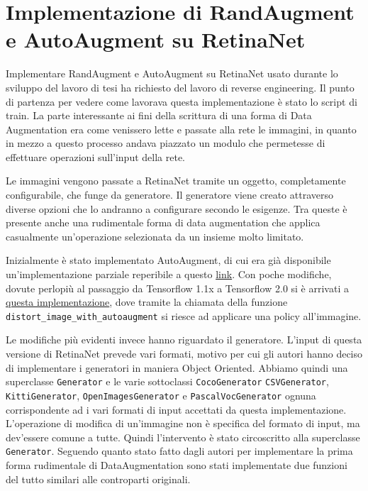 \chapter{Implementazione di RandAugment e AutoAugment su RetinaNet}


Implementare RandAugment e AutoAugment su RetinaNet usato durante lo sviluppo del lavoro di tesi ha richiesto del lavoro di reverse engineering. Il punto di partenza per vedere come lavorava questa implementazione è stato lo script di train. La parte interessante ai fini della scrittura di una forma di Data Augmentation era come venissero lette e passate alla rete le immagini, in quanto in mezzo a questo processo andava piazzato un modulo che permetesse di effettuare operazioni sull'input della rete. 

Le immagini vengono passate a RetinaNet tramite un oggetto, completamente configurabile, che funge da generatore. Il generatore viene creato attraverso diverse opzioni che lo andranno a configurare secondo le esigenze. Tra queste è presente anche una rudimentale forma di data augmentation che applica casualmente un'operazione selezionata da un insieme molto limitato. 

Inizialmente è stato implementato AutoAugment, di cui era già disponibile un'implementazione parziale reperibile a questo \href{https://github.com/tensorflow/tpu/blob/master/models/official/detection/utils/autoaugment_utils.py}{link}. Con poche modifiche, dovute perlopiù al passaggio da Tensorflow 1.1x a Tensorflow 2.0 si è arrivati a \href{https://github.com/iskorini/keras-retinanet/blob/master/keras_retinanet/utils/autoaugment_utils_tf2.py}{questa implementazione}, dove tramite la chiamata della funzione \texttt{distort\_image\_with\_autoaugment} si riesce ad applicare una policy all'immagine. 

Le modifiche più evidenti invece hanno riguardato il generatore. L'input di questa versione di RetinaNet prevede vari formati, motivo per cui gli autori hanno deciso di implementare i generatori in maniera Object Oriented. Abbiamo quindi una superclasse \texttt{Generator} e le varie sottoclassi \texttt{CocoGenerator} \texttt{CSVGenerator}, \texttt{KittiGenerator}, \texttt{OpenImagesGenerator} e \texttt{PascalVocGenerator} ognuna corrispondente ad i vari formati di input accettati da questa implementazione. L'operazione di modifica di un'immagine non è specifica del formato di input, ma dev'essere comune a tutte. Quindi l'intervento è stato circoscritto alla superclasse \texttt{Generator}. Seguendo quanto stato fatto dagli autori per implementare la prima forma rudimentale di DataAugmentation sono stati implementate due funzioni del tutto similari alle controparti originali. 


